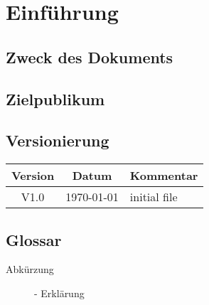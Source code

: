 \section{Einführung}
		\subsection{Zweck des Dokuments}
		\subsection{Zielpublikum}
		\subsection{Versionierung}
			\begin{table}[h]
				\centering
				\begin{tabularx}{\textwidth}{|c|c|X|}
				\hline
				\rowcolor{shadecolor}\textbf{Version} & \textbf{Datum} & \textbf{Kommentar}\\ \hline
				V1.0 & \today & initial file \\ \hline
				\end{tabularx}
			\end{table}
		\subsection{Glossar}
			\begin{description}
				\item[Abkürzung]- Erklärung
			\end{description}
